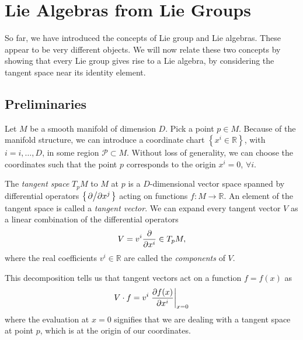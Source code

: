 
\chapter{Lie Algebras from Lie Groups}%
\label{cha:lie_algebras_from_lie_groups}

So far, we have introduced the concepts of Lie group and Lie algebras.
These appear to be very different objects. We will now relate these two concepts by showing that every Lie group gives rise to a Lie algebra, by considering the tangent space near its identity element.

\section{Preliminaries}%
\label{sec:preliminaries}

Let $M$ be a smooth manifold of dimension $D$. Pick a point $p \in M$.
Because of the manifold structure, we can introduce a coordinate chart $\left\{ x^i \in \mathbb{R} \right\}$, with $i = i, \ldots, D$, in some region $\mathcal{P} \subset M$.
Without loss of generality, we can choose the coordinates such that the point $p$ corresponds to the origin $x^i = 0$, $\forall i$.

\begin{definition}
  The \emph{tangent space} $T_p M$ to $M$ at $p$ is a $D$-dimensional vector space spanned by differential operators $\left\{ \pdv*{}{x^j} \right\}$ acting on functions $f \colon M \to \mathbb{R}$.
  An element of the tangent space is called a \emph{tangent vector}. 
  We can expand every tangent vector $V$ as a linear combination of the differential operators
  \begin{equation}
    V = v^i \pdv{}{x^i} \in T_p  M,
  \end{equation}
  where the real coefficients $v^i \in \mathbb{R}$ are called the \emph{components} of $V$.
\end{definition}
This decomposition tells us that tangent vectors act on a function $f = f(x)$ as
\begin{equation}
  V \cdot f = v^i \left.\pdv{f(x)}{x^i} \right\rvert_{x = 0}
\end{equation}
where the evaluation at $x = 0$ signifies that we are dealing with a tangent space at point $p$, which is at the origin of our coordinates.

